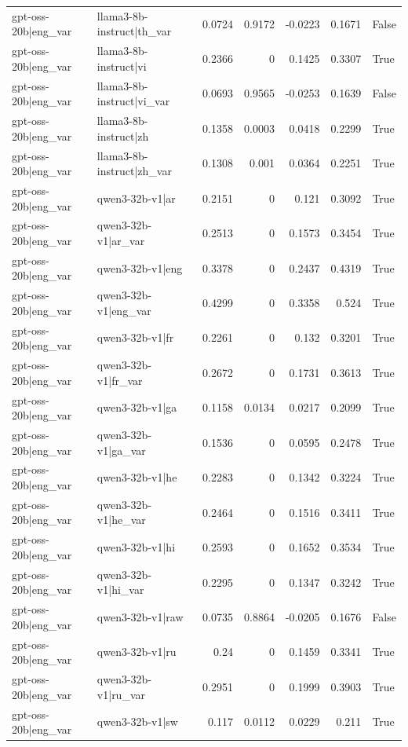 \begin{table}
\begin{tabular}{l l r r r r l}
gpt-oss-20b|eng_var & llama3-8b-instruct|th_var & 0.0724 & 0.9172 & -0.0223 & 0.1671 & False \\
gpt-oss-20b|eng_var & llama3-8b-instruct|vi & 0.2366 & 0 & 0.1425 & 0.3307 & True \\
gpt-oss-20b|eng_var & llama3-8b-instruct|vi_var & 0.0693 & 0.9565 & -0.0253 & 0.1639 & False \\
gpt-oss-20b|eng_var & llama3-8b-instruct|zh & 0.1358 & 0.0003 & 0.0418 & 0.2299 & True \\
gpt-oss-20b|eng_var & llama3-8b-instruct|zh_var & 0.1308 & 0.001 & 0.0364 & 0.2251 & True \\
gpt-oss-20b|eng_var & qwen3-32b-v1|ar & 0.2151 & 0 & 0.121 & 0.3092 & True \\
gpt-oss-20b|eng_var & qwen3-32b-v1|ar_var & 0.2513 & 0 & 0.1573 & 0.3454 & True \\
gpt-oss-20b|eng_var & qwen3-32b-v1|eng & 0.3378 & 0 & 0.2437 & 0.4319 & True \\
gpt-oss-20b|eng_var & qwen3-32b-v1|eng_var & 0.4299 & 0 & 0.3358 & 0.524 & True \\
gpt-oss-20b|eng_var & qwen3-32b-v1|fr & 0.2261 & 0 & 0.132 & 0.3201 & True \\
gpt-oss-20b|eng_var & qwen3-32b-v1|fr_var & 0.2672 & 0 & 0.1731 & 0.3613 & True \\
gpt-oss-20b|eng_var & qwen3-32b-v1|ga & 0.1158 & 0.0134 & 0.0217 & 0.2099 & True \\
gpt-oss-20b|eng_var & qwen3-32b-v1|ga_var & 0.1536 & 0 & 0.0595 & 0.2478 & True \\
gpt-oss-20b|eng_var & qwen3-32b-v1|he & 0.2283 & 0 & 0.1342 & 0.3224 & True \\
gpt-oss-20b|eng_var & qwen3-32b-v1|he_var & 0.2464 & 0 & 0.1516 & 0.3411 & True \\
gpt-oss-20b|eng_var & qwen3-32b-v1|hi & 0.2593 & 0 & 0.1652 & 0.3534 & True \\
gpt-oss-20b|eng_var & qwen3-32b-v1|hi_var & 0.2295 & 0 & 0.1347 & 0.3242 & True \\
gpt-oss-20b|eng_var & qwen3-32b-v1|raw & 0.0735 & 0.8864 & -0.0205 & 0.1676 & False \\
gpt-oss-20b|eng_var & qwen3-32b-v1|ru & 0.24 & 0 & 0.1459 & 0.3341 & True \\
gpt-oss-20b|eng_var & qwen3-32b-v1|ru_var & 0.2951 & 0 & 0.1999 & 0.3903 & True \\
gpt-oss-20b|eng_var & qwen3-32b-v1|sw & 0.117 & 0.0112 & 0.0229 & 0.211 & True \\

\end{tabular}
\end{table}
